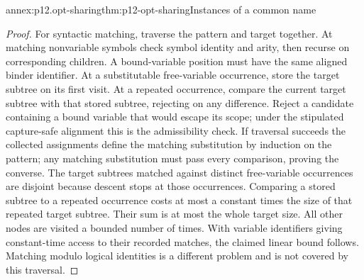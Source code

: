 \begin{annexitem}{annex:p12.opt-sharing}{thm:p12-opt-sharing}{Instances of a common name}
\begin{proof}
For syntactic matching, traverse the pattern and target together.
At matching nonvariable symbols check symbol identity and arity,
then recurse on corresponding children. A bound-variable position
must have the same aligned binder identifier. At a substitutable
free-variable occurrence, store the target subtree on its first
visit. At a repeated occurrence, compare the current target subtree
with that stored subtree, rejecting on any difference. Reject a
candidate containing a bound variable that would escape its scope;
under the stipulated capture-safe alignment this is the admissibility
check. If traversal succeeds the collected assignments define the
matching substitution by induction on the pattern; any matching
substitution must pass every comparison, proving the converse.
The target subtrees matched against distinct free-variable
occurrences are disjoint because descent stops at those occurrences.
Comparing a stored subtree to a repeated occurrence costs at most
a constant times the size of that repeated target subtree.
Their sum is at most the whole target size. All other nodes are
visited a bounded number of times. With variable identifiers giving
constant-time access to their recorded matches, the claimed linear
bound follows. Matching modulo logical identities is a different
problem and is not covered by this traversal.
\end{proof}
\end{annexitem}

